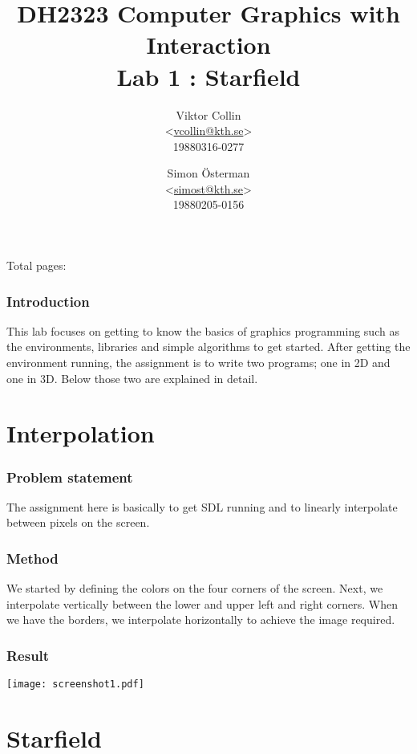 \documentclass[a4paper,11pt]{article}
\author{Viktor Collin \\ <\url{vcollin@kth.se}> \\ 19880316-0277 \and Simon \"{O}sterman \\ <\url{simost@kth.se}> \\ 19880205-0156}
\title{\textbf{DH2323 Computer Graphics with Interaction \\ Lab 1 : Starfield}}
\begin{document}
\maketitle
\begin{center}
Total pages: \pageref{LastPage}
\end{center}
\thispagestyle{empty}

\clearpage
\setcounter{page}{1}
\section{Introduction}
This lab focuses on getting to know the basics of graphics programming such as the 
environments, libraries and simple algorithms to get started. After getting the environment running, the assignment is to write two programs; one in 2D and one in 3D. Below those two are explained in detail. 

\part{Interpolation}
\section{Problem statement}
The assignment here is basically to get SDL running and to linearly interpolate between pixels on the screen.

\section{Method}
We started by defining the colors on the four corners of the screen. Next, we interpolate vertically between the lower and upper left and right corners. When we have the borders, we interpolate horizontally to achieve the image required. 
\section{Result}
\texttt{[image: screenshot1.pdf]}

\clearpage
\part{Starfield}
\end{document}
